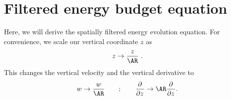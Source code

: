 \documentclass[../Rajarshi-thesis-draft.tex]{subfiles}
\begin{document}
\section{Filtered energy budget equation}\label{edwv-fluxeqn}

Here, we will derive the spatially filtered energy evolution equation. For convenience, we scale our vertical coordinate $z$ as
\begin{align}
 \begin{split}
 z \to \frac{z}{\AR} \ .
 \end{split}
\end{align}
This changes the vertical velocity and the vertical derivative to
\begin{align}
 \begin{split}
 w \to \frac{w}{\AR} \qquad ; \qquad \Dp{}{z}{}\to \AR \Dp{}{z}{} .
 \end{split}
\end{align}
\end{document}
